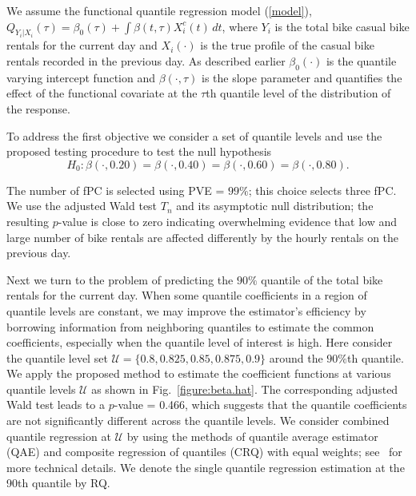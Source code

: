\documentclass[times,sort&compress,3p]{elsarticle}
\theoremstyle{plain}%
\theoremstyle{definition}
\begin{document}
We assume the functional quantile regression model (\ref{model}), $Q_{Y_i|X_i}(\tau) = \beta_0(\tau) + \int \beta(t, \tau) X_i^c(t) \, dt$, where $Y_i$ is the total bike casual bike rentals for the current day and $X_i(\cdot)$ is the true profile of the casual bike rentals recorded in the previous day. As described earlier $\beta_0(\cdot)$ is the quantile varying intercept function and $\beta(\cdot, \tau)$ is the slope parameter and quantifies the effect of the functional covariate at the $\tau$th quantile level of the distribution of the response. 

To address the first objective we consider a set of quantile levels and use the proposed testing procedure to test the null hypothesis
$$
H_0: \beta(\cdot, 0.20)=  \beta(\cdot, 0.40)=  \beta(\cdot, 0.60)= \beta(\cdot, 0.80).
$$

The number of fPC is selected using PVE = $99 \%$; this choice selects three fPC. We use the adjusted Wald test $T_n$ and its asymptotic null distribution; the resulting $p$-value is close to zero indicating overwhelming evidence that low and large number of bike rentals are affected differently by the hourly rentals on the previous day. 


Next we turn to the problem of predicting the $90\%$ quantile of the total bike rentals for the current day. When some quantile coefficients in a region of quantile levels are constant, we may improve the estimator's efficiency by borrowing information from neighboring quantiles to estimate the common coefficients, especially when the quantile level of interest is high. Here consider the quantile level set $\mathcal{U} = \{0.8, 0.825, 0.85, 0.875, 0.9\}$ around the $90\%$th quantile. We apply the proposed method to estimate the coefficient functions at various quantile levels $\mathcal{U}$ as shown in Fig.~\ref{figure:beta.hat}. The corresponding adjusted Wald test leads to a $p$-value = 0.466,  which suggests that the quantile coefficients are not significantly different across the quantile levels. We consider combined quantile regression at $\mathcal{U}$ by using the methods of quantile average estimator (QAE) and composite regression of quantiles (CRQ) with equal weights; see~\cite{koenker1984,kehuisinica} for more technical details. We denote the single quantile regression estimation at the 90th quantile by RQ.  
\end{document}
